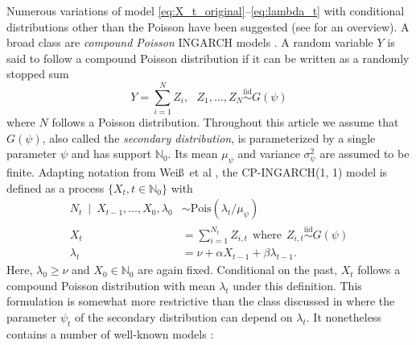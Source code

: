 \documentclass{article}
\begin{document}
Numerous variations of model \eqref{eq:X_t_original}--\eqref{eq:lambda_t} with conditional distributions other than the Poisson have been suggested (see \cite{Weiss2018} for an overview). A broad class are \textit{compound Poisson} INGARCH models \cite{Goncalves2015, Silva2016}. A random variable $Y$ is said to follow a compound Poisson distribution \cite[Chapter 3]{Feller1968} if it can be written as a randomly stopped sum 
$$
Y = \sum_{i = 1}^N Z_i, \ \ \ Z_1, \dots, Z_N \stackrel{\text{iid}}{\sim} G(\psi)
$$
where $N$ follows a Poisson distribution. Throughout this article we assume that $G(\psi)$, also called the \textit{secondary distribution}, is parameterized by a single parameter $\psi$ and has support $\mathbb{N}_0$. Its mean $\mu_\psi$ and variance $\sigma^2_\psi$ are assumed to be finite. Adapting notation from Wei\ss\ et al \cite[Sec. 2]{Weiss2017}, the CP-INGARCH(1, 1) model is defined as a process $\{X_t, t \in \mathbb{N}_0\}$ with %
\begin{align}
N_t \ \mid \ X_{t - 1}, \dots, X_0, \lambda_0 & \sim \text{Pois}(\lambda_t/\mu_\psi) \label{eq:N_CP_original}\\
X_t & = \sum_{i = 1}^{N_t} Z_{i, t} \ \ \text{where} \ \  Z_{i, t} \stackrel{\text{iid}}{\sim} G(\psi)\label{eq:X_CP_original}\\
\lambda_t & = \nu + \alpha X_{t - 1} + \beta \lambda_{t - 1}.\label{eq:lambda_CP_original}
\end{align}
Here, $\lambda_0 \geq \nu$ and $X_0 \in \mathbb{N}_0$ are again fixed. Conditional on the past, $X_t$ follows a compound Poisson distribution with mean $\lambda_t$ under this definition. %
This formulation is somewhat more restrictive than the class discussed in \citep{Goncalves2015} where the parameter $\psi_t$ of the secondary distribution can depend on $\lambda_t$. It nonetheless contains a number of well-known models \cite[Observation 2]{Goncalves2015}:
\end{document}
